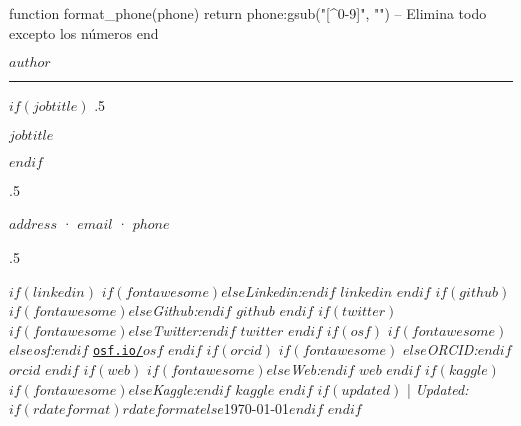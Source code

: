 
\usepackage{datetime}


\usepackage{orcidlink}

\usepackage{luacode}

\begin{luacode}
function format_phone(phone)
    return phone:gsub("[^0-9]", "") -- Elimina todo excepto los números
end
\end{luacode}



\centerline{\huge \bf $author$}

\vspace{2 mm}

\hrule

\vspace{2 mm}

$if(jobtitle)$
\moveleft.5\hoffset\centerline{$jobtitle$}
$endif$

\moveleft.5\hoffset\centerline{$address$ · \href{mailto:$email$}{\tt $email$} · \href{tel:+\directlua{tex.sprint(format_phone("$phone$"))}}{\tt $phone$}}

\moveleft.5\hoffset\centerline{
  $if(linkedin)$
    $if(fontawesome)$\faLinkedin \hspace{1 mm}$else$\emph{Linkedin:}$endif$ \href{https://linkedin.com/in/$linkedin$}{\tt $linkedin$} \hspace{1 mm}
  $endif$
  $if(github)$
    $if(fontawesome)$\faGithub \hspace{1 mm}$else$\emph{Github:}$endif$ \href{https://github.com/$github$}{\tt $github$} \hspace{1 mm}
  $endif$
  $if(twitter)$
    $if(fontawesome)$\faTwitter \hspace{1 mm}$else$\emph{Twitter:}$endif$ \href{https:/twitter.com/$twitter$}{\tt $twitter$} \hspace{1 mm}
  $endif$
  $if(osf)$
    $if(fontawesome)$\faUnlock \hspace{1 mm}$else$\emph{osf:}$endif$ \href{https:/osf.io/$osf$}{\tt osf.io/$osf$} \hspace{1 mm}
  $endif$
  $if(orcid)$
    $if(fontawesome)$ \hspace{.5 mm}$else$\emph{ORCID:}$endif$ \href{https://orcid.org/$orcid$}{\tt $orcid$} \hspace{1 mm}
  $endif$
  $if(web)$
    $if(fontawesome)$\faGlobe \hspace{1 mm}$else$\emph{Web:}$endif$ \href{https://$web$}{\tt $web$}
  $endif$
  $if(kaggle)$
    $if(fontawesome)$\faKaggle \hspace{1 mm}$else$\emph{Kaggle:}$endif$ \href{https://kaggle.com/$kaggle$}{\tt $kaggle$} \hspace{1 mm}
  $endif$
  $if(updated)$
    | \emph{Updated:} $if(rdateformat)$$rdateformat$$else$\apstylekinda\today$endif$
  $endif$
}

